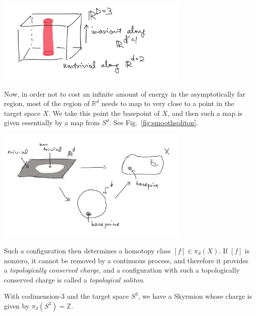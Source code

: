 \documentclass[12pt]{article}
\numberwithin{equation}{section}
\renewenvironment{figure}[1][]{
  \begin{originalfigure}[#1]
    \begin{mdframed}[linecolor=black!0,backgroundcolor=black!1]
}{
    \end{mdframed}
  \end{originalfigure}
}
\def\bR{\mathbb{R}}
\def\bZ{\mathbb{Z}}
\begin{document}
\begin{figure}[h]
\centering
  \includegraphics[width=0.7\textwidth]{codimension.png}
  \caption{A codimension-2 object in $\bR^3$ is string-like. }
  \label{fig:codimension}
\end{figure}

Now, in order not to cost an infinite amount of energy in the asymptotically far region,
most of the region of $\bR^d$ needs to map to very close to a point in the target space $X$.
We take this point the basepoint of $X$,
and then such a map is given essentially by a map from $S^d$.
See Fig.~\ref{fig:smoothsoliton}.


\begin{figure}[h]
\centering
  \includegraphics[width=0.7\textwidth]{smoothsoliton.png}
  \caption{A smooth, finite-energy, codimension-$d$ configuration is given by a map $S^d\to X$. }
  \label{fig:smoothsoliton}
\end{figure}

Such a configuration then determines a homotopy class $ [f]\in \pi_d(X)$.
If $[f]$ is nonzero, it cannot be removed by a continuous process,
and therefore it provides a \emph{topologically conserved charge},
and a configuration with such a topologically conserved charge is called a \emph{topological soliton}.

\begin{example}
With codimension-$3$ and the target space $S^3$, we have a Skyrmion whose charge is given by $\pi_3(S^3)=\bZ$.
\end{example}
\end{document}
